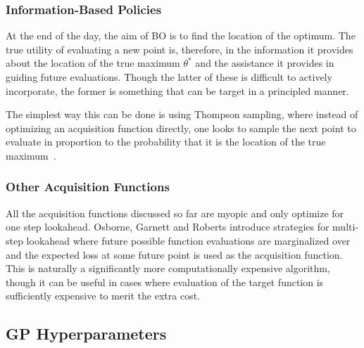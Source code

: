 \subsubsection{Information-Based Policies}
\label{sec:opt:BO:acq:inf}

At the end of the day, the aim of BO is to find the location of the optimum.  The true utility of
evaluating a new point is, therefore, in the information it provides about the location of the
true maximum $\theta^*$ and the assistance it provides in guiding future evaluations.  Though 
the latter of these is difficult to actively incorporate, the former is something that can be
target in a principled manner.  

The simplest way this can be done is using Thompson sampling\cite{thompson1933likelihood}, 
where instead of optimizing an acquisition function directly, one looks to sample the next
point to evaluate in proportion to the probability that it is the location of the true
maximum~\cite{shahriari2014entropy,kandasamy2017asynchronous}.



\subsubsection{Other Acquisition Functions}
\label{sec:opt:BO:acq:other}

All the acquisition functions discussed so far are myopic and only optimize for one step lookahead.  Osborne, Garnett and Roberts \cite{osborne2009gaussian, garnett2010bayesian} introduce strategies for multi-step lookahead where future possible function evaluations are marginalized over and the expected loss at some future point is used as the acquisition function.  This is naturally a significantly more computationally expensive algorithm, though it can be useful in cases where evaluation of the target function is sufficiently expensive to merit the extra cost.

\subsection{GP Hyperparameters}
\label{sec:opt:BO:hyp}

